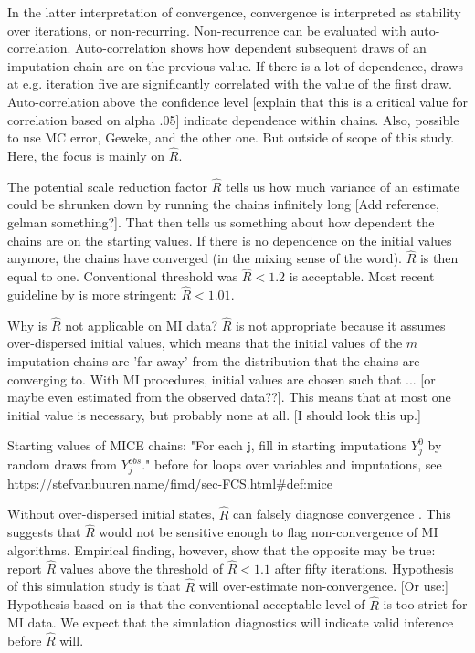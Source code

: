 \documentclass[article]{jss}
\begin{document}
In the latter interpretation of convergence, convergence is interpreted as stability over iterations, or non-recurring. Non-recurrence can be evaluated with auto-correlation. Auto-correlation shows how dependent subsequent draws of an imputation chain are on the previous value. If there is a lot of dependence, draws at e.g. iteration five are significantly correlated with the value of the first draw. Auto-correlation above the confidence level [explain that this is a critical value for correlation based on alpha .05] indicate dependence within chains. Also, possible to use MC error, Geweke, and the other one. But outside of scope of this study. Here, the focus is mainly on $\widehat{R}$.

The potential scale reduction factor $\widehat{R}$ tells us how much variance of an estimate could be shrunken down by running the chains infinitely long [Add reference, gelman something?]. That then tells us something about how dependent the chains are on the starting values. If there is no dependence on the initial values anymore, the chains have converged (in the mixing sense of the word). $\widehat{R}$ is then equal to one. Conventional threshold was $\widehat{R} < 1.2$ is acceptable. Most recent guideline by \cite{veht19} is more stringent: $\widehat{R} < 1.01$. 



Why is $\widehat{R}$ not applicable on MI data? $\widehat{R}$ is not appropriate because it assumes over-dispersed initial values, which means that the initial values of the $m$ imputation chains are 'far away' from the distribution that the chains are converging to. With MI procedures, initial values are chosen such that ... [or maybe even estimated from the observed data??]. This means that at most one initial value is necessary, but probably none at all. [I should look this up.] 

Starting values of MICE chains: "For each j, fill in starting imputations $Y^0_j$ by random draws from $Y^{obs}_j$." \cite[\S~4.5.2]{buur18} before for loops over variables and imputations, see \url{https://stefvanbuuren.name/fimd/sec-FCS.html#def:mice}


Without over-dispersed initial states, $\widehat{R}$ can falsely diagnose convergence \citep{broo98}. %
This suggests that $\widehat{R}$ would not be sensitive enough to flag non-convergence of MI algorithms. Empirical finding, however, show that the opposite may be true: \cite{lace07} report $\widehat{R}$ values above the threshold of $\widehat{R} < 1.1$ after fifty iterations. %
Hypothesis of this simulation study is that $\widehat{R}$ will over-estimate non-convergence. [Or use:] Hypothesis based on \cite{lace07} is that the conventional acceptable level of $\widehat{R}$ is too strict for MI data. We expect that the simulation diagnostics will indicate valid inference before $\widehat{R}$ will. 
\end{document}
